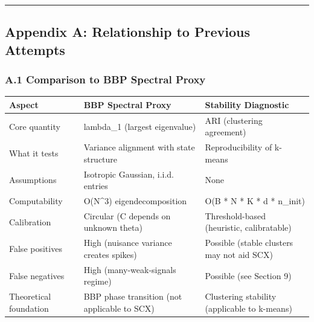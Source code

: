 \documentclass[
  12pt,
]{ctexart}
\begin{document}
\begin{center}\rule{0.5\linewidth}{0.5pt}\end{center}

\subsection{Appendix A: Relationship to Previous
Attempts}\label{appendix-a-relationship-to-previous-attempts}

\subsubsection{A.1 Comparison to BBP Spectral
Proxy}\label{a.1-comparison-to-bbp-spectral-proxy}

\begin{longtable}[]{@{}
  >{\raggedright\arraybackslash}p{}
  >{\raggedright\arraybackslash}p{}
  >{\raggedright\arraybackslash}p{}@{}}
\toprule\noalign{}
\begin{minipage}[b]{\linewidth}\raggedright
Aspect
\end{minipage} & \begin{minipage}[b]{\linewidth}\raggedright
BBP Spectral Proxy
\end{minipage} & \begin{minipage}[b]{\linewidth}\raggedright
Stability Diagnostic
\end{minipage} \\
\midrule\noalign{}
\endhead
\bottomrule\noalign{}
\endlastfoot
Core quantity & lambda\_1 (largest eigenvalue) & ARI (clustering
agreement) \\
What it tests & Variance alignment with state structure &
Reproducibility of k-means \\
Assumptions & Isotropic Gaussian, i.i.d. entries & None \\
Computability & O(N\^{}3) eigendecomposition & O(B * N * K * d *
n\_init) \\
Calibration & Circular (C depends on unknown theta) & Threshold-based
(heuristic, calibratable) \\
False positives & High (nuisance variance creates spikes) & Possible
(stable clusters may not aid SCX) \\
False negatives & High (many-weak-signals regime) & Possible (see
Section 9) \\
Theoretical foundation & BBP phase transition (not applicable to SCX) &
Clustering stability (applicable to k-means) \\
\end{longtable}
\end{document}
